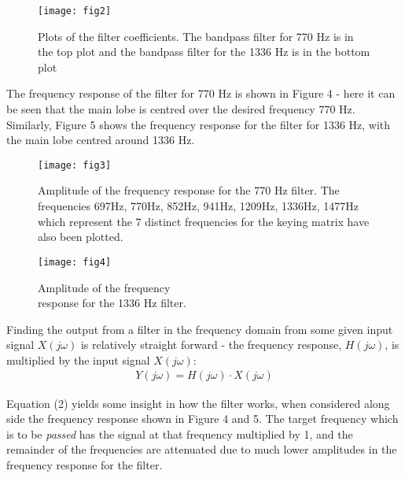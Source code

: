 \documentclass{article}
\begin{document}
\begin{figure}[H]
	\centering
	\texttt{[image: fig2]}
	\caption{Plots of the filter coefficients. The bandpass filter for 770 $\si{\hertz}$ is in the top plot and the bandpass filter for the 1336 $\si{\hertz}$ is in the bottom plot}
\end{figure}

The frequency response of the filter for 770 $\si{\hertz}$ is shown in Figure 4 - here it can be seen that the main lobe is centred over the desired frequency 770 $\si{\hertz}$. Similarly, Figure 5 shows the frequency response for the filter for 1336 $\si{\hertz}$, with the main lobe centred around 1336 $\si{\hertz}$.

\begin{figure}[H]
	\begin{minipage}[t]{0.5\linewidth}
		\texttt{[image: fig3]}
		\caption{Amplitude of the frequency response for the 770 $\si{\hertz}$ filter. The frequencies 697$\si{\hertz}$, 770$\si{\hertz}$, 852$\si{\hertz}$, 941$\si{\hertz}$, 1209$\si{\hertz}$, 1336$\si{\hertz}$, 1477$\si{\hertz}$ which represent the 7 distinct frequencies for the keying matrix have also been plotted.}
	\end{minipage}
	\hspace{0.5cm}
	\begin{minipage}[t]{0.5\linewidth}
		\texttt{[image: fig4]}
		\caption{Amplitude of the frequency\\ response for the 1336 $\si{\hertz}$ filter.}
	\end{minipage}
\end{figure}

Finding the output from a filter in the frequency domain from some given input signal $X(j \omega)$ is relatively straight forward - the frequency response, $H(j \omega)$, is multiplied by the input signal $X(j \omega)$:
\begin{align}
Y(j \omega) = H(j \omega) \cdot X(j \omega)
\end{align}

Equation (2) yields some insight in how the filter works, when considered along side the frequency response shown in Figure 4 and 5. The target frequency which is to be \textit{passed} has the signal at that frequency multiplied by 1, and the remainder of the frequencies are attenuated due to much lower amplitudes in the frequency response for the filter.
\end{document}
